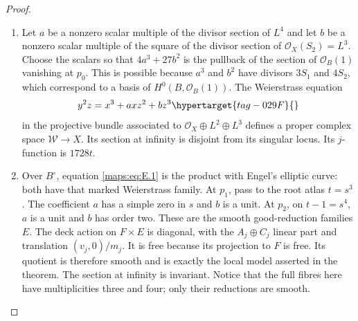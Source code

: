 \documentclass[11pt,a4paper]{article}
\numberwithin{equation}{section}
\theoremstyle{definition}
\begin{document}
\begin{proof}
\begin{enumerate}[label=\arabic*.,leftmargin=*]
\item Let $a$ be a nonzero scalar multiple of the divisor section of $L^4$
and let $b$ be a nonzero scalar multiple of the square of the divisor
section of $\mathcal O_X(S_2)=L^3$.  Choose the scalars so that
$4a^3+27b^2$ is the pullback of the section of $\mathcal O_B(1)$
vanishing at $p_0$.  This is possible because $a^3$ and $b^2$ have
divisors $3S_1$ and $4S_2$, which correspond to a basis of
$H^0(B,\mathcal O_B(1))$.  The Weierstrass equation
\begin{equation}
 y^2z=x^3+axz^2+bz^3
 \hypertarget{tag-029F}{}\label{maps:eq:E.1}
\end{equation}
in the projective bundle associated to
$\mathcal O_X\oplus L^2\oplus L^3$ defines a proper complex space
$\mathscr W\to X$.  Its section at infinity is disjoint from its
singular locus.  Its $j$-function is $1728t$.

\item Over $B^\circ$, equation \eqref{maps:eq:E.1} is the product with Engel's elliptic
curve: both have that marked Weierstrass family.  At $p_1$, pass to the
root atlas $t=s^3$.  The coefficient $a$ has a simple zero in $s$
and $b$ is a unit.  At $p_2$, on $t-1=s^4$, $a$ is a unit and $b$ has
order two.  These are the smooth good-reduction families $E$.
The deck action on $F\times E$ is diagonal, with the $A_j\oplus C_j$ linear part and translation $(v_j,0)/m_j$.
It is free because its projection to $F$ is free.  Its quotient is
therefore smooth and is exactly the local model asserted in the theorem.
The section at infinity is invariant.  Notice that the full fibres here
have multiplicities three and four; only their reductions are smooth.


\end{enumerate}
\end{proof}
\end{document}
